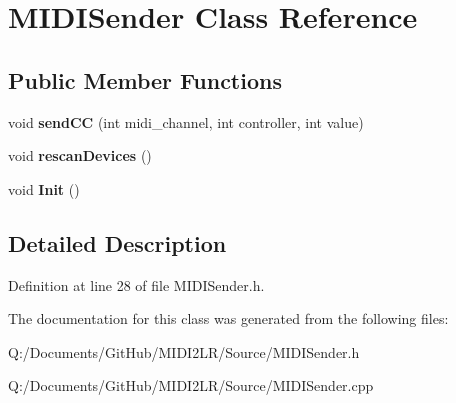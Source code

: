 \hypertarget{class_m_i_d_i_sender}{}\section{M\+I\+D\+I\+Sender Class Reference}
\label{class_m_i_d_i_sender}
\subsection*{Public Member Functions}
\begin{DoxyCompactItemize}
\item 
void {\bfseries send\+CC} (int midi\+\_\+channel, int controller, int value)\hypertarget{class_m_i_d_i_sender_a8aa4f3945bb0c926ffd40d6bc35e2063}{}\label{class_m_i_d_i_sender_a8aa4f3945bb0c926ffd40d6bc35e2063}

\item 
void {\bfseries rescan\+Devices} ()\hypertarget{class_m_i_d_i_sender_ad8590bd597858304c1a812b3b4988086}{}\label{class_m_i_d_i_sender_ad8590bd597858304c1a812b3b4988086}

\item 
void {\bfseries Init} ()\hypertarget{class_m_i_d_i_sender_ab563687fe6dd2b274a1694140ef7c08c}{}\label{class_m_i_d_i_sender_ab563687fe6dd2b274a1694140ef7c08c}

\end{DoxyCompactItemize}


\subsection{Detailed Description}


Definition at line 28 of file M\+I\+D\+I\+Sender.\+h.



The documentation for this class was generated from the following files\+:\begin{DoxyCompactItemize}
\item 
Q\+:/\+Documents/\+Git\+Hub/\+M\+I\+D\+I2\+L\+R/\+Source/M\+I\+D\+I\+Sender.\+h\item 
Q\+:/\+Documents/\+Git\+Hub/\+M\+I\+D\+I2\+L\+R/\+Source/M\+I\+D\+I\+Sender.\+cpp\end{DoxyCompactItemize}
